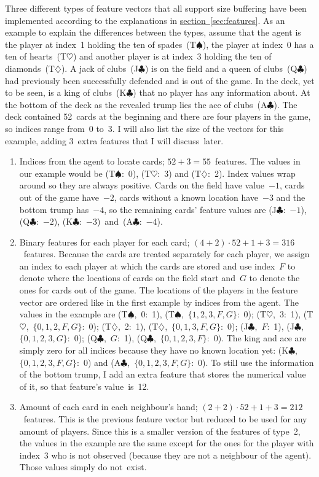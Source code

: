 \documentclass[a4paper,titlepage]{article}
\begin{document}
Three different types of feature vectors that all support size buffering have been implemented according to the explanations in \hyperref[sec:features]{section~\ref*{sec:features}}.
As an example to explain the differences between the types, assume that the agent is the player at index~1 holding the ten of spades~(T$\spadesuit$), the player at index~0 has a ten of hearts~(T$\heartsuit$) and another player is at index~3 holding the ten of diamonds~(T$\diamondsuit$). A jack of clubs~(J$\clubsuit$) is on the field and a queen of clubs~(Q$\clubsuit$) had previously been successfully defended and is out of the game. In the deck, yet to be seen, is a king of clubs~(K$\clubsuit$) that no player has any information about. At the bottom of the deck as the revealed trump lies the ace of clubs~(A$\clubsuit$). The deck contained 52~cards at the beginning and there are four players in the game, so indices range from~0 to~3. I will also list the size of the vectors for this example, adding 3~extra features that I will discuss~later.
\begin{enumerate} %
  \item Indices from the agent to locate cards; $52 + 3 = 55$~features. The values in our example would be (T$\spadesuit$:~0), (T$\heartsuit$:~3) and (T$\diamondsuit$:~2). Index values wrap around so they are always positive. Cards on the field have value~$-1$, cards out of the game have~$-2$, cards without a known location have~$-3$ and the bottom trump has~$-4$, so the remaining cards' feature values are (J$\clubsuit$:~$-1$), (Q$\clubsuit$:~$-2$), (K$\clubsuit$:~$-3$)~and~(A$\clubsuit$:~$-4$).
  \item Binary features for each player for each card; $(4 + 2) \cdot 52  + 1 + 3 = 316$~features. Because the cards are treated separately for each player, we assign an index to each player at which the cards are stored and use index~$F$ to denote where the locations of cards on the field start and~$G$ to denote the ones for cards out of the game. The locations of the players in the feature vector are ordered like in the first example by indices from the agent. The values in the example are (T$\spadesuit$,~0:~1), (T$\spadesuit$,~$\{1, 2, 3, F, G\}$:~0); (T$\heartsuit$,~3:~1), (T$\heartsuit$,~$\{0, 1, 2, F, G\}$:~0); (T$\diamondsuit$,~2:~1), (T$\diamondsuit$,~$\{0, 1, 3, F, G\}$:~0); (J$\clubsuit$,~$F$:~1), (J$\clubsuit$,~$\{0, 1, 2, 3, G\}$:~0); (Q$\clubsuit$,~$G$:~1), (Q$\clubsuit$,~$\{0, 1, 2, 3, F\}$:~0).
  The king and ace are simply zero for all indices because they have no known location yet: (K$\clubsuit$,~$\{0, 1, 2, 3, F, G\}$:~0) and (A$\clubsuit$,~$\{0, 1, 2, 3, F, G\}$:~0). To still use the information of the bottom trump, I add an extra feature that stores the numerical value of it, so that feature's value~is~12.
  \item Amount of each card in each neighbour's hand; $(2 + 2) \cdot 52 + 1 + 3 = 212$~features. This is the previous feature vector but reduced to be used for any amount of players. Since this is a smaller version of the features of type~2, the values in the example are the same except for the ones for the player with index~3 who is not observed (because they are not a neighbour of the agent). Those values simply do not~exist.
\end{enumerate}
\end{document}
